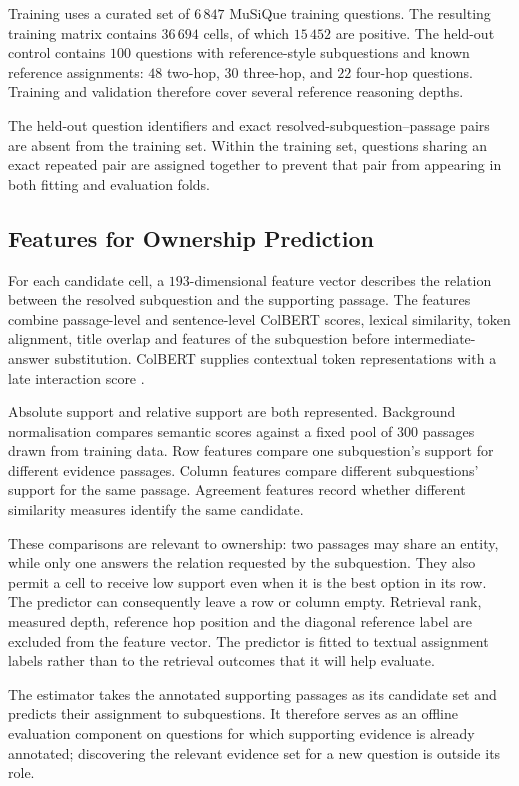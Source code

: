 Training uses a curated set of $6\,847$ MuSiQue training questions. The
resulting training matrix contains $36\,694$ cells, of which $15\,452$ are
positive. The held-out control contains $100$ questions with reference-style
subquestions and known reference assignments: $48$ two-hop, $30$ three-hop,
and $22$ four-hop questions. Training and validation therefore cover several
reference reasoning depths.

The held-out question identifiers and exact resolved-subquestion--passage pairs
are absent from the training set. Within the training set, questions sharing an
exact repeated pair are assigned together to prevent that pair from appearing
in both fitting and evaluation folds.

\subsection{Features for Ownership Prediction}

For each candidate cell, a $193$-dimensional feature vector describes the
relation between the resolved subquestion and the supporting passage. The
features combine passage-level and sentence-level ColBERT scores, lexical
similarity, token alignment, title overlap and features of the subquestion
before intermediate-answer substitution. ColBERT supplies contextual token
representations with a late interaction score \cite{khattab2020colbert}.

Absolute support and relative support are both represented. Background
normalisation compares semantic scores against a fixed pool of $300$ passages
drawn from training data. Row features compare one subquestion's support for
different evidence passages. Column features compare different subquestions'
support for the same passage. Agreement features record whether different
similarity measures identify the same candidate.

These comparisons are relevant to ownership: two passages may share an entity,
while only one answers the relation requested by the subquestion. They also
permit a cell to receive low support even when it is the best option in its row.
The predictor can consequently leave a row or column empty. Retrieval rank,
measured depth, reference hop position and the diagonal reference label are
excluded from the feature vector. The predictor is fitted to textual assignment
labels rather than to the retrieval outcomes that it will help evaluate.

The estimator takes the annotated supporting passages as its candidate set and predicts 
their assignment to subquestions. It therefore serves as an offline evaluation component 
on questions for which supporting evidence is already annotated; discovering the relevant 
evidence set for a new question is outside its role.

